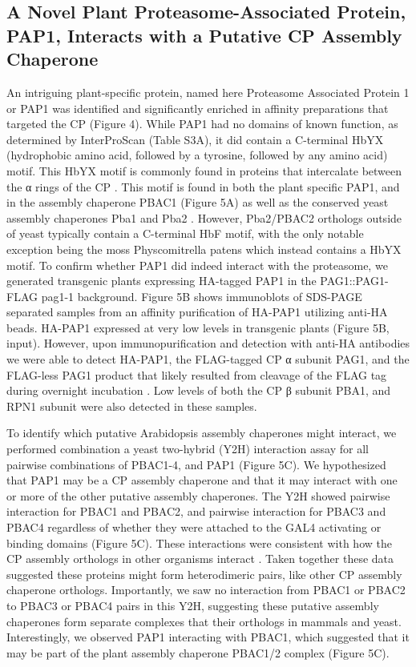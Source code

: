 \subsection{A Novel Plant Proteasome-Associated Protein, PAP1, Interacts with a Putative CP Assembly Chaperone}
	An intriguing plant-specific protein, named here Proteasome Associated Protein 1 or PAP1 was identified and significantly enriched in affinity preparations that targeted the CP (Figure 4). While PAP1 had no domains of known function, as determined by InterProScan (Table S3A), it did contain a C-terminal HbYX (hydrophobic amino acid, followed by a tyrosine, followed by any amino acid) motif. This HbYX motif is commonly found in proteins that intercalate between the α rings of the CP \citep{kusmierczyk11}. This motif is found in both the plant specific PAP1, and in the assembly chaperone PBAC1 (Figure 5A) as well as the conserved yeast assembly chaperones Pba1 and Pba2 \citep{kusmierczyk11}. However, Pba2/PBAC2 orthologs outside of yeast typically contain a C-terminal HbF motif, with the only notable exception being the moss Physcomitrella patens which instead contains a HbYX motif.   To confirm whether PAP1 did indeed interact with the proteasome, we generated transgenic plants expressing HA-tagged PAP1 in the PAG1::PAG1-FLAG pag1-1 background. Figure 5B shows immunoblots of SDS-PAGE separated samples from an affinity purification of HA-PAP1 utilizing anti-HA beads. HA-PAP1 expressed at very low levels in transgenic plants (Figure 5B, input). However, upon immunopurification and detection with anti-HA antibodies we were able to detect HA-PAP1, the FLAG-tagged CP α subunit PAG1, and the FLAG-less PAG1 product that likely resulted from cleavage of the FLAG tag during overnight incubation \citep{book10}. Low levels of both the CP β subunit PBA1, and RPN1 subunit were also detected in these samples. 

	To identify which putative Arabidopsis assembly chaperones might interact, we performed combination a yeast two-hybrid (Y2H) interaction assay for all pairwise combinations of PBAC1-4, and PAP1 (Figure 5C). We hypothesized that PAP1 may be a CP assembly chaperone and that it may interact with one or more of the other putative assembly chaperones. The Y2H showed pairwise interaction for PBAC1 and PBAC2, and pairwise interaction for PBAC3 and PBAC4 regardless of whether they were attached to the GAL4 activating or binding domains (Figure 5C). These interactions were consistent with how the CP assembly orthologs in other organisms interact \citep{murata09}.  Taken together these data suggested these proteins might form heterodimeric pairs, like other CP assembly chaperone orthologs. Importantly, we saw no interaction from PBAC1 or PBAC2 to PBAC3 or PBAC4 pairs in this Y2H, suggesting these putative assembly chaperones form separate complexes that their orthologs in mammals and yeast. Interestingly, we observed PAP1 interacting with PBAC1, which suggested that it may be part of the plant assembly chaperone PBAC1/2 complex (Figure 5C).

